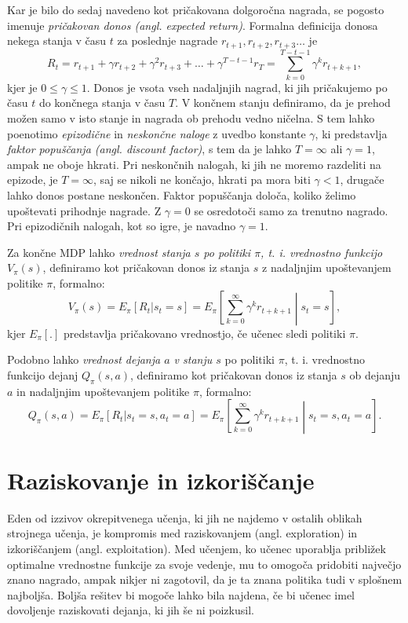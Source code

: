 \documentclass[a4paper, oneside, 12pt]{report}
\begin{document}
Kar je bilo do sedaj navedeno kot pričakovana dolgoročna nagrada, se pogosto imenuje {\em pričakovan donos (angl. expected return)}. Formalna definicija donosa nekega stanja v času $t$ za poslednje nagrade $r_{t+1}, r_{t+2}, r_{t+3} \dots$ je
\begin{equation}
R_t = r_{t+1} + \gamma r_{t+2} + \gamma^2 r_{t+3} + \dots + \gamma^{T-t-1} r_T = \sum_{k=0}^{T-t-1} \gamma^k r_{t+k+1},
\end{equation}
kjer je $0 \le \gamma \le 1$. Donos je vsota vseh nadaljnjih nagrad, ki jih pričakujemo po času $t$ do končnega stanja v času $T$. V končnem stanju definiramo, da je prehod možen samo v isto stanje in nagrada ob prehodu vedno ničelna. S tem lahko poenotimo {\em epizodične} in {\em neskončne naloge} z uvedbo konstante $\gamma$, ki predstavlja {\em faktor popuščanja (angl. discount factor)}, s tem da je lahko $T = \infty$ ali $\gamma = 1$, ampak ne oboje hkrati. Pri neskončnih nalogah, ki jih ne moremo razdeliti na epizode, je $T = \infty$, saj se nikoli ne končajo, hkrati pa mora biti $\gamma < 1$, drugače lahko donos postane neskončen. Faktor popuščanja določa, koliko želimo upoštevati prihodnje nagrade. Z $\gamma = 0$ se osredotoči samo za trenutno nagrado. Pri epizodičnih nalogah, kot so igre, je navadno $\gamma = 1$.

Za končne MDP lahko {\em vrednost stanja $s$ po politiki $\pi$, t. i. vrednostno funkcijo $V_\pi(s)$}, definiramo kot pričakovan donos iz stanja $s$ z nadaljnjim upoštevanjem politike $\pi$, formalno:
\begin{equation}
V_\pi(s) = E_\pi[R_t | s_t = s] = E_\pi\left[\sum_{k=0}^\infty \gamma^k r_{t+k+1} \middle| s_t = s\right],
\end{equation}
kjer $E_\pi[.]$ predstavlja pričakovano vrednostjo, če učenec sledi politiki $\pi$.

Podobno lahko {\em vrednost dejanja $a$ v stanju $s$} po politiki $\pi$, t. i. vrednostno funkcijo dejanj $Q_\pi(s, a)$, definiramo kot pričakovan donos iz stanja $s$ ob dejanju $a$ in nadaljnjim upoštevanjem politike $\pi$, formalno:
\begin{equation}
Q_\pi(s, a) = E_\pi[R_t | s_t = s, a_t = a] = E_\pi\left[\sum_{k=0}^\infty \gamma^k r_{t+k+1} \middle| s_t = s, a_t = a\right].
\end{equation}

\section{Raziskovanje in izkoriščanje}
Eden od izzivov okrepitvenega učenja, ki jih ne najdemo v ostalih oblikah strojnega učenja, je kompromis med raziskovanjem (angl. exploration) in izkoriščanjem (angl. exploitation). Med učenjem, ko učenec uporablja približek optimalne vrednostne funkcije za svoje vedenje, mu to omogoča pridobiti največjo znano nagrado, ampak nikjer ni zagotovil, da je ta znana politika tudi v splošnem najboljša. Boljša rešitev bi mogoče lahko bila najdena, če bi učenec imel dovoljenje raziskovati dejanja, ki jih še ni poizkusil.
\end{document}
